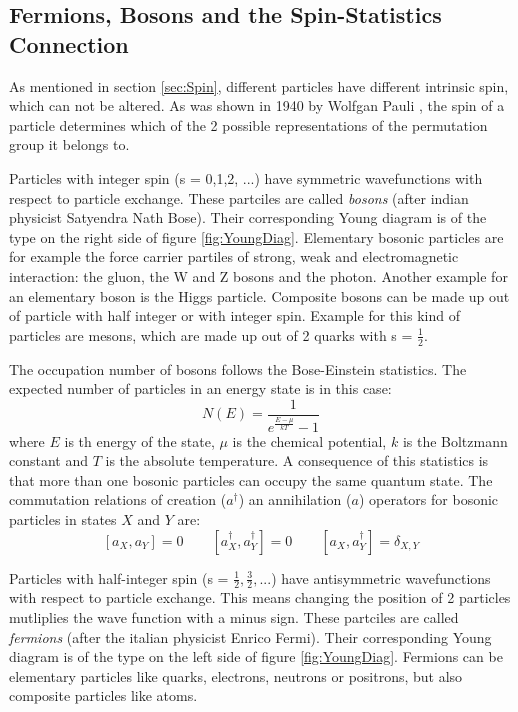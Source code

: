 \subsection{Fermions, Bosons and the Spin-Statistics Connection}

As mentioned in section \ref{sec:Spin}, different particles have different intrinsic spin, which can not be altered. As was shown in 1940 by Wolfgan Pauli \cite{Pauli1940}, the spin of a particle determines which of the 2 possible representations of the permutation group it belongs to. 

Particles with integer spin (s = 0,1,2, ...) have symmetric wavefunctions with respect to particle exchange. These partciles are called \textit{bosons} (after indian physicist Satyendra Nath Bose). Their corresponding Young diagram is of the type on the right side of figure \ref{fig:YoungDiag}. Elementary bosonic particles are for example the force carrier partiles of strong, weak and electromagnetic interaction: the gluon, the W and Z bosons and the photon. Another example for an elementary boson is the Higgs particle. Composite bosons can be made up out of particle with half integer or with integer spin. Example for this kind of particles are mesons, which are made up out of 2 quarks with s = $\frac{1}{2}$. 

The occupation number of bosons follows the Bose-Einstein statistics. The expected number of particles in an energy state is in this case:
\begin{equation}
 N(E) = \frac{1}{e^{\frac{E-\mu}{kT}}-1}
\end{equation} 
where $E$ is th energy of the state, $\mu$ is the chemical potential, $k$ is the Boltzmann constant and $T$ is the absolute temperature. A consequence of this statistics is that more than one bosonic particles can occupy the same quantum state. The commutation relations of creation ($a^{\dag}$) an annihilation ($a$) operators for bosonic particles in states $X$ and $Y$ are:
\begin{equation}
\label{eq:bosComm}
 [a_{X},a_{Y}] = 0 \hspace{2em} [a^{\dag}_{X},a^{\dag}_{Y}] = 0 \hspace{2em} [a_{X},a^{\dag}_{Y}] = \delta_{X,Y}
\end{equation} 

Particles with half-integer spin (s = $\frac{1}{2},\frac{3}{2},...$) have antisymmetric wavefunctions with respect to particle exchange. This means changing the position of 2 particles mutliplies the wave function with a minus sign. These partciles are called \textit{fermions} (after the italian physicist Enrico Fermi). Their corresponding Young diagram is of the type on the left side of figure \ref{fig:YoungDiag}. Fermions can be elementary particles like quarks, electrons, neutrons or positrons, but also composite particles like atoms. 

